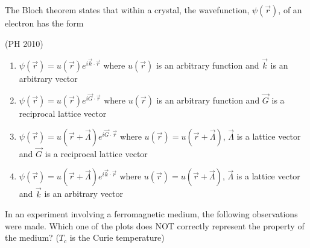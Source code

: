 \item The Bloch theorem states that within a crystal, the wavefunction, $\psi(\vec{r})$, of an electron has the form 

\hfill{(PH 2010)}

\begin{enumerate}
\item $\psi(\vec{r}) = u(\vec{r}) e^{i \vec{k} \cdot \vec{r}}$ where $u(\vec{r})$ is an arbitrary function and $\vec{k}$ is an arbitrary vector 
\item $\psi(\vec{r}) = u(\vec{r}) e^{i \vec{G} \cdot \vec{r}}$ where $u(\vec{r})$ is an arbitrary function and $\vec{G}$ is a reciprocal lattice vector 
\item $\psi(\vec{r}) = u(\vec{r} + \vec{\Lambda}) e^{i \vec{G} \cdot \vec{r}}$ where $u(\vec{r}) = u(\vec{r} + \vec{\Lambda})$, $\vec{\Lambda}$ is a lattice vector and $\vec{G}$ is a reciprocal lattice vector 
\item $\psi(\vec{r}) = u(\vec{r} + \vec{\Lambda}) e^{i \vec{k} \cdot \vec{r}}$ where $u(\vec{r}) = u(\vec{r} + \vec{\Lambda})$, $\vec{\Lambda}$ is a lattice vector and $\vec{k}$ is an arbitrary vector
\end{enumerate}


\item In an experiment involving a ferromagnetic medium, the following observations were made. Which one of the plots does NOT correctly represent the property of the medium? ($T_c$ is the Curie temperature) 

